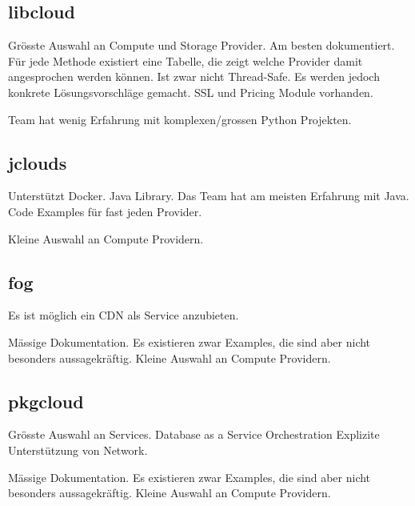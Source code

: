 \subsection{libcloud}
\begin{Argumentation}
\pro Grösste Auswahl an Compute und Storage Provider.
\pro Am besten dokumentiert. Für jede Methode existiert eine Tabelle, die zeigt welche Provider 
damit angesprochen werden können.
\pro Ist zwar nicht Thread-Safe. Es werden jedoch konkrete Lösungsvorschläge gemacht.
\pro SSL und Pricing Module vorhanden.

\contra Team hat wenig Erfahrung mit komplexen/grossen Python Projekten.
\end{Argumentation}

\subsection{jclouds}
\begin{Argumentation}
\pro Unterstützt Docker.
\pro Java Library. Das Team hat am meisten Erfahrung mit Java.
\pro Code Examples für fast jeden Provider.

\contra Kleine Auswahl an Compute Providern.
\end{Argumentation}

\subsection{fog}
\begin{Argumentation}
\pro Es ist möglich ein CDN als Service anzubieten.

\contra Mässige Dokumentation. Es existieren zwar 
Examples, die sind aber nicht besonders aussagekräftig.
\contra Kleine Auswahl an Compute Providern.
\end{Argumentation}

\subsection{pkgcloud}
\begin{Argumentation}
\pro Grösste Auswahl an Services.
\pro Database as a Service
\pro Orchestration
\pro Explizite Unterstützung von Network.

\contra Mässige Dokumentation. Es existieren zwar Examples, die sind aber nicht besonders aussagekräftig.
\contra Kleine Auswahl an Compute Providern.
\end{Argumentation}

